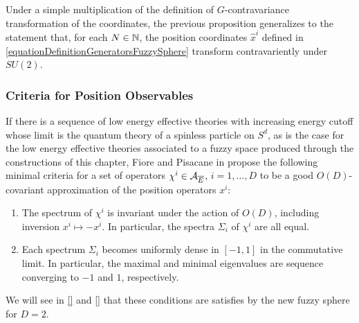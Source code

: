 Under a simple multiplication of the definition of $G$-contravariance transformation of the coordinates, the previous proposition generalizes to the statement that, for each $N \in \mathbb{N}$, the position coordinates $\hat x^i$ defined in \eqref{equationDefinitionGeneratorsFuzzySphere} transform contravariently under $SU(2)$.

\lin

\subsubsection{Criteria for Position Observables}\label{subsectionCriteriaGOodApproximationsOfPosition}

If there is a sequence of low energy effective theories with increasing energy cutoff whose limit is the quantum theory of a spinless particle on $S^d$, as is the case for the low energy effective theories associated to a fuzzy space produced through the constructions of this chapter, Fiore and Pisacane in \cite{FioreTheCase2020} propose the following minimal criteria for a set of operators $\chi^i \in \mathcal A_{\overline{E}}$, $i = 1, \dots, D$ to be a good $O(D)$-covariant approximation of the position operators $x^i$:
    \begin{enumerate}
    
    \item The spectrum of $\chi^i$ is invariant under the action of $O(D)$, including inversion $x^i \mapsto -x^i$. In particular, the spectra $\Sigma_i$ of $\chi^i$ are all equal.
    
    \item Each spectrum $\Sigma_i$ becomes uniformly dense in $[-1, 1]$ in the commutative limit. In particular, the maximal and minimal eigenvalues are sequence converging to $-1$ and $1$, respectively.
    
    \end{enumerate}

 We will see in \ref{} and \ref{} that these conditions are satisfies by the new fuzzy sphere for $D=2$.
    
